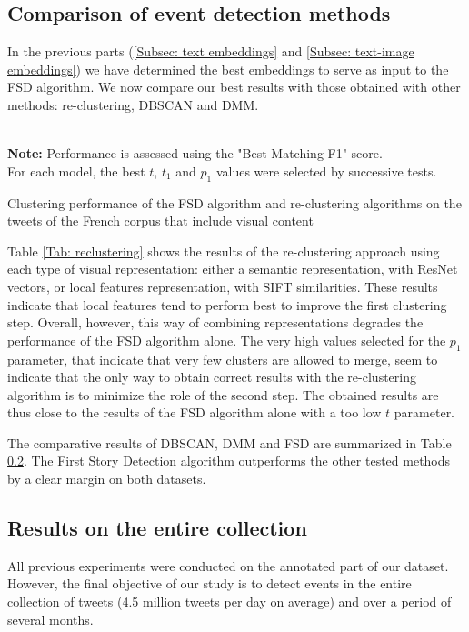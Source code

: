 \subsection{Comparison of event detection methods}

In the previous parts (\ref{Subsec: text embeddings} and \ref{Subsec: text-image embeddings})  we have determined the best embeddings to serve as input to the FSD algorithm. We now compare our best results with those obtained with other methods: re-clustering, DBSCAN and DMM.

\begin{table}[ht]
\begin{center}

\\

{\scriptsize \textbf{Note:} Performance is assessed using the "Best Matching F1" score.\\ 
For each model, the best $t$, $t_1$ and $p_1$ values were selected by successive tests.}
\caption{Clustering performance of the FSD algorithm and re-clustering algorithms on the tweets of the French corpus that include visual content} \label{Tab: reclustering}
\end{center}
\end{table}
Table \ref{Tab: reclustering} shows the results of the re-clustering approach using each type of visual representation: either a semantic representation, with ResNet vectors, or local features representation, with SIFT similarities. These results indicate that local features tend to perform best to improve the first clustering step. Overall, however, this way of combining representations degrades the performance of the FSD algorithm alone. The very high values selected for the $p_1$ parameter, that indicate that very few clusters are allowed to merge, seem to indicate that the only way to obtain correct results with the re-clustering algorithm is to minimize the role of the second step. The obtained results are thus close to the results of the FSD algorithm alone with a too low $t$ parameter.

The comparative results of DBSCAN, DMM and FSD are summarized in Table \ref{}. The First Story Detection algorithm outperforms the other tested methods by a clear margin on both datasets.

\subsection{Results on the entire collection}
All previous experiments were conducted on the annotated part of our dataset. However, the final objective of our study is to detect events in the entire collection of tweets (4.5 million tweets per day on average) and over a period of several months. 

